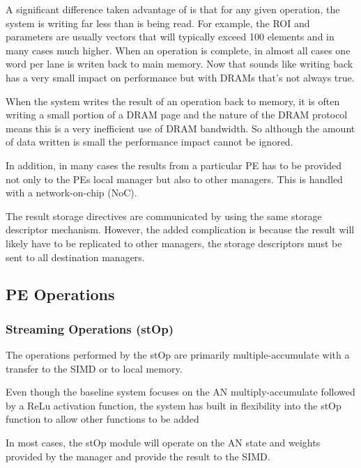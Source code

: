 \documentclass[journal]{IEEEtran}
\begin{document}
A significant difference taken advantage of is that for any given operation, the system is writing far less than is being read. For example, the ROI and parameters are usually vectors that will typically exceed 100 elements and in many cases much higher. When an operation is complete, in almost all cases one word per lane is writen back to main memory. 
Now that sounds like writing back has a very small impact on performance but with DRAMs that's not always true.

When the system writes the result of an operation back to memory, it is often writing a small portion of a DRAM page and the nature of the DRAM protocol means this is a very inefficient use of DRAM bandwidth. So although the amount of data written is small the performance impact cannot be ignored.

In addition, in many cases the results from a particular PE has to be provided not only to the PEs local manager but also to other managers. This is handled with a network-on-chip (NoC).

The result storage directives are communicated by using the same storage descriptor mechanism. However, the added complication is because the result will likely have to be replicated to other managers, the storage descriptors must be sent to all destination managers.


\subsection{PE Operations}
\label{sec:PE Operations}

\subsubsection{Streaming Operations (stOp)}
\label{ssec:streamingOps}
The operations performed by the stOp are primarily multiple-accumulate with a transfer to the SIMD or to local memory.

Even though the baseline system focuses on the AN multiply-accumulate followed by a ReLu activation function, the system has built in flexibility into the stOp function to allow other functions to be added

In most cases, the stOp module will operate on the AN state and weights provided by the manager and provide the result to the SIMD.
\end{document}
